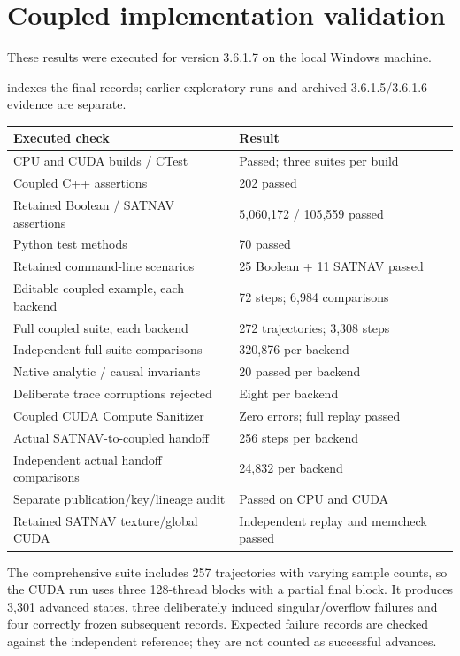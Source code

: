 \section{Coupled implementation validation}
These results were executed for version 3.6.1.7 on the local Windows machine.

 indexes the final records; earlier exploratory
runs and archived 3.6.1.5/3.6.1.6 evidence are separate.

\begin{center}
\begin{tabularx}{\textwidth}{@{}P{.54\textwidth}Y@{}}\toprule
\textbf{Executed check} & \textbf{Result}\\\midrule
CPU and CUDA builds / CTest & Passed; three suites per build\\
Coupled C++ assertions & 202 passed\\
Retained Boolean / SATNAV assertions & 5,060,172 / 105,559 passed\\
Python test methods & 70 passed\\
Retained command-line scenarios & 25 Boolean + 11 SATNAV passed\\
Editable coupled example, each backend & 72 steps; 6,984 comparisons\\
Full coupled suite, each backend & 272 trajectories; 3,308 steps\\
Independent full-suite comparisons & 320,876 per backend\\
Native analytic / causal invariants & 20 passed per backend\\
Deliberate trace corruptions rejected & Eight per backend\\
Coupled CUDA Compute Sanitizer & Zero errors; full replay passed\\
Actual SATNAV-to-coupled handoff & 256 steps per backend\\
Independent actual handoff comparisons & 24,832 per backend\\
Separate publication/key/lineage audit & Passed on CPU and CUDA\\
Retained SATNAV texture/global CUDA & Independent replay and memcheck passed\\\bottomrule
\end{tabularx}
\end{center}

The comprehensive suite includes 257 trajectories with varying sample counts, so
the CUDA run uses three 128-thread blocks with a partial final block. It produces
3,301 advanced states, three deliberately induced singular/overflow failures and
four correctly frozen subsequent records. Expected failure records are checked
against the independent reference; they are not counted as successful advances.

